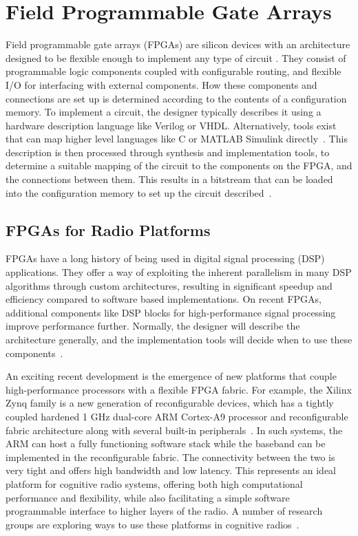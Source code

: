 \section{Field Programmable Gate Arrays }
Field programmable gate arrays (FPGAs) are silicon devices with an architecture designed to be flexible enough to implement any type of circuit \cite{Kuon2008}.
They consist of programmable logic components coupled with configurable routing, and flexible I/O for interfacing with external components.
How these components and connections are set up is determined according to the contents of a configuration memory.
To implement a circuit, the designer typically describes it using a hardware description language like Verilog or VHDL.
Alternatively, tools exist that can map higher level languages like C or MATLAB Simulink directly~\cite{Springer2008}.
This description is then processed through synthesis and implementation tools, to determine a suitable mapping of the circuit to the components on the FPGA, and the connections between them.
This results in a bitstream that can be loaded into the configuration memory to set up the circuit described~\cite{Xilinx2013c}.
\subsection{FPGAs for Radio Platforms}
FPGAs have a long history of being used in digital signal processing (DSP) applications.
They offer a way of exploiting the inherent parallelism in many DSP algorithms through custom architectures, resulting in significant speedup and efficiency compared to software based implementations.
On recent FPGAs, additional components like DSP blocks for high-performance signal processing improve performance further.
Normally, the designer will describe the architecture generally, and the implementation tools will decide when to use these components~\cite{Xilinx2013d}.

An exciting recent development is the emergence of new platforms that couple high-performance processors with a flexible FPGA fabric.
For example, the Xilinx Zynq family is a new generation of reconfigurable devices, which has a tightly coupled hardened 1 GHz dual-core ARM Cortex-A9 processor and reconfigurable fabric architecture along with several built-in peripherals~\cite{Xilinx2013}.
In such systems, the ARM can host a fully functioning software stack while the baseband can be implemented in the reconfigurable fabric. The connectivity between the two is very tight and offers high bandwidth and low latency. This represents an ideal platform for cognitive radio systems, offering both high computational performance and flexibility, while also facilitating a simple software programmable interface to higher layers of the radio.
A number of research groups are exploring ways to use these platforms in cognitive radios~\cite{Dobson2014}.

